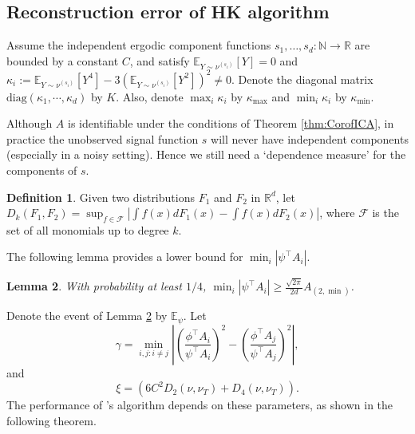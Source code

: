 \documentclass[twoside]{article}
\newcommand{\scom}[1]{s_{#1}}
\newcommand{\Epsi}{\mathbb{E}_{\psi}}
\newcommand{\E}{\mathbb{E}}
\newcommand{\ra}{\rightarrow}
\newcommand{\real}{\mathbb{R}}
\renewcommand{\natural}{\mathbb{N}}
\newtheorem{lemma}{Lemma}[section]
\theoremstyle{definition}
\newtheorem{definition}[lemma]{Definition}
\begin{document}
\subsection{Reconstruction error of HK algorithm}
\label{subsec:errorHK}
Assume the independent ergodic component functions $\scom{1},\ldots,\scom{d}:\natural \ra \real$ are bounded by a constant $C$, and satisfy $\E_{Y\sim\nu^{(\scom{i})}}[Y]=0$ and $\kappa_i := \E_{Y\sim \nu^{(\scom{i})}}[Y^4] - 3\left(\E_{Y\sim \nu^{(\scom{i})}}[Y^2]\right)^2\neq 0$.
Denote the diagonal matrix $\text{diag}(\kappa_1,\cdots,\kappa_d)$ by $K$. 
Also, denote $\max_{i} \kappa_i$ by $\kappa_{\max}$ and $\min_{i} \kappa_i$ by $\kappa_{\min}$.

Although $A$ is identifiable under the conditions of Theorem \ref{thm:CorofICA}, in practice the unobserved signal function $s$ will never have independent components (especially in a noisy setting). 
Hence we still need a `dependence measure' for the components of $s$.
\begin{definition}
Given two distributions $F_1$ and $F_2$ in $\real^d$, let $D_k(F_1,F_2) = \sup_{f\in\mathcal{F}} |\int f(x)dF_1(x) - \int f(x)dF_2(x)|$, where $\mathcal{F}$ is the set of all monomials up to degree $k$.
\end{definition} 
The following lemma provides a lower bound for $\min_i |\psi^{\top}A_i|$.
\begin{lemma}
\label{lem:dmin}
With probability at least $1/4$, $\min_i |\psi^{\top}A_i| \ge \frac{\sqrt{2\pi}}{2d}A_{(2,\min)}$.  
\end{lemma}
Denote the event of Lemma \ref{lem:dmin} by $\Epsi$. Let 
\begin{equation}
\label{def:kappa}
\gamma =  \min_{i,j: i\neq j} \left\vert \left(\frac{\phi^{\top}A_i}{\psi^{\top}A_i}\right)^2 - \left(\frac{\phi^{\top}A_j}{\psi^{\top}A_j}\right)^2 \right\vert, 
\end{equation}
and 
\[
\xi = \left( 6C^2D_2(\nu, \nu_T) + D_4(\nu, \nu_T)\right).
\]
The performance of \citet{DHsu2012}'s algorithm depends on these parameters, as shown in the following theorem.
\end{document}
